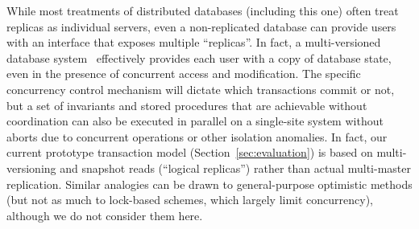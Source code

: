  While most treatments of
distributed databases (including this one) often treat replicas as
individual servers, even a non-replicated database can provide users
with an interface that exposes multiple ``replicas''. In fact, a
multi-versioned database system~\cite{bernstein-book} effectively
provides each user with a copy of database state, even in the presence
of concurrent access and modification. The specific concurrency
control mechanism will dictate which transactions commit or not, but a
set of invariants and stored procedures that are achievable without
coordination can also be executed in parallel on a single-site system
without aborts due to concurrent operations or other isolation
anomalies.  In fact, our current prototype transaction model
(Section~\ref{sec:evaluation}) is based on multi-versioning and
snapshot reads (``logical replicas'') rather than actual multi-master
replication. Similar analogies can be drawn to general-purpose
optimistic methods (but not as much to lock-based schemes, which
largely limit concurrency), although we do not consider them here.
